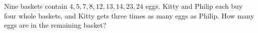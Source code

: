Nine baskets contain $4,5,7,8,12,13,14,23,24$ eggs. Kitty and Philip each buy four whole baskets, and Kitty gets three times as many eggs as Philip. How many eggs are in the remaining basket?
